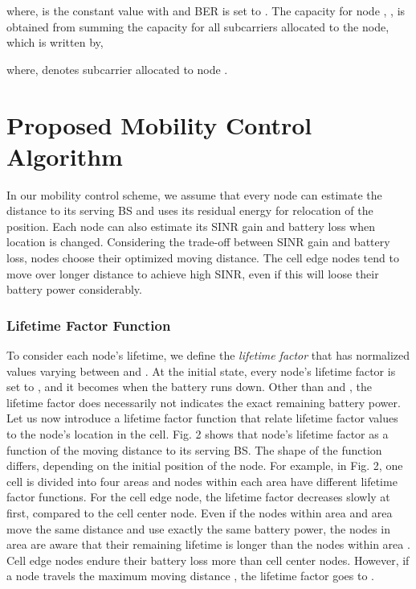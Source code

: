 \documentclass[conference]{IEEEtran}
\begin{document}
\noindent where,  is the constant value with  and BER is set to  \cite{Lei}. The capacity for node , , is obtained from summing the capacity for all subcarriers allocated to the node, which is written by,



\noindent where,  denotes  subcarrier allocated to node .




\section{Proposed Mobility Control Algorithm }


In our mobility control scheme, we assume that every node can estimate the distance to its serving BS and uses its residual energy for relocation of the position. Each node can also estimate its SINR gain and battery loss when location is changed. Considering the trade-off between SINR gain and battery loss, nodes choose their optimized moving distance. The cell edge nodes tend to move over longer distance to achieve high SINR, even if this will loose their battery power considerably.

\subsubsection{Lifetime Factor Function}
To consider each node's lifetime,
we define the \emph{lifetime factor} that has normalized values varying between   and . At the initial
state, every node's lifetime factor is set to , and it becomes
 when the battery runs down. Other than  and , the lifetime
factor does necessarily not indicates the exact remaining
battery power. Let us now introduce a lifetime factor function that
relate lifetime factor values to the node's location in the
cell. Fig. 2 shows that  node's lifetime
factor  as a function of the moving distance  to its serving BS. The shape of the function  differs, depending on the
initial position of the node. For example, in Fig. 2, one cell is divided into
four areas and nodes within each area have different lifetime factor
functions. For the cell edge node, the lifetime factor decreases
slowly at first, compared to the cell center node. Even if the
nodes within area  and area  move the same distance and use
exactly the same battery power, the nodes in area  are aware that
their remaining lifetime is longer than the nodes within area .
Cell edge nodes endure their battery loss more than cell center nodes.
However, if a node travels the maximum
moving distance , the lifetime factor goes
to .
\end{document}
